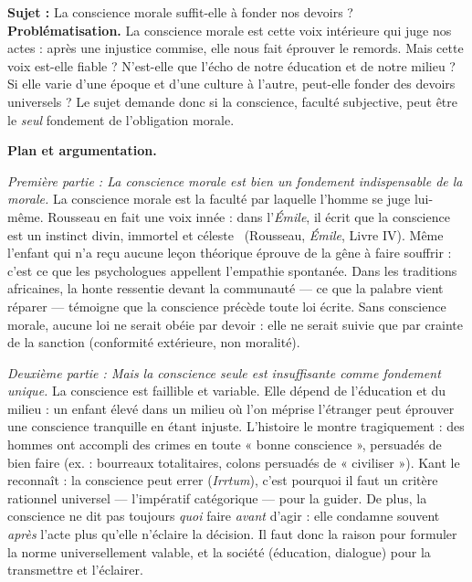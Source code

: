 \documentclass[11pt]{article}
\begin{document}
\begin{exoresolu}
\textbf{Sujet :} La conscience morale suffit-elle à fonder nos devoirs ?
\tcblower
\textbf{Problématisation.} La conscience morale est cette voix intérieure qui juge nos actes : après une injustice commise, elle nous fait éprouver le remords. Mais cette voix est-elle fiable ? N'est-elle que l'écho de notre éducation et de notre milieu ? Si elle varie d'une époque et d'une culture à l'autre, peut-elle fonder des devoirs universels ? Le sujet demande donc si la conscience, faculté subjective, peut être le \emph{seul} fondement de l'obligation morale.

\textbf{Plan et argumentation.}

\emph{Première partie : La conscience morale est bien un fondement indispensable de la morale.} La conscience morale est la faculté par laquelle l'homme se juge lui-même. Rousseau en fait une voix innée : dans l'\emph{Émile}, il écrit que la conscience est \guillemotleft un instinct divin, immortel et céleste \guillemotright\ (Rousseau, \emph{Émile}, Livre IV). Même l'enfant qui n'a reçu aucune leçon théorique éprouve de la gêne à faire souffrir : c'est ce que les psychologues appellent l'empathie spontanée. Dans les traditions africaines, la honte ressentie devant la communauté — ce que la palabre vient réparer — témoigne que la conscience précède toute loi écrite. Sans conscience morale, aucune loi ne serait obéie par devoir : elle ne serait suivie que par crainte de la sanction (conformité extérieure, non moralité).

\emph{Deuxième partie : Mais la conscience seule est insuffisante comme fondement unique.} La conscience est faillible et variable. Elle dépend de l'éducation et du milieu : un enfant élevé dans un milieu où l'on méprise l'étranger peut éprouver une conscience tranquille en étant injuste. L'histoire le montre tragiquement : des hommes ont accompli des crimes en toute « bonne conscience », persuadés de bien faire (ex. : bourreaux totalitaires, colons persuadés de « civiliser »). Kant le reconnaît : la conscience peut errer (\emph{Irrtum}), c'est pourquoi il faut un critère rationnel universel — l'impératif catégorique — pour la guider. De plus, la conscience ne dit pas toujours \emph{quoi} faire \emph{avant} d'agir : elle condamne souvent \emph{après} l'acte plus qu'elle n'éclaire la décision. Il faut donc la raison pour formuler la norme universellement valable, et la société (éducation, dialogue) pour la transmettre et l'éclairer.


\end{exoresolu}
\end{document}
